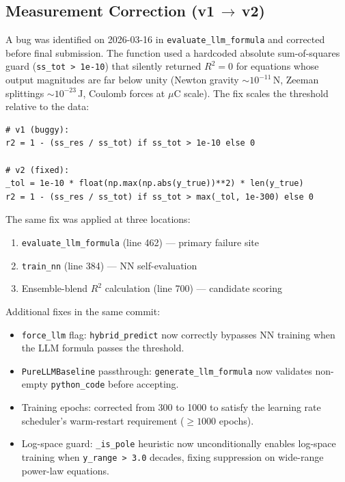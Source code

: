 \documentclass[twoside,11pt]{article}
\begin{document}
\subsection*{Measurement Correction (v1\,$\to$\,v2)}
\label{sec:r2_measurement_bugfix}

A bug was identified on 2026-03-16 in \texttt{evaluate\_llm\_formula}
and corrected before final submission. The function used a hardcoded
absolute sum-of-squares guard (\texttt{ss\_tot > 1e-10}) that silently
returned $R^2=0$ for equations whose output magnitudes are far below unity
(Newton gravity $\sim\!10^{-11}$\,N, Zeeman splittings $\sim\!10^{-23}$\,J,
Coulomb forces at $\mu$C scale). The fix scales the threshold relative
to the data:

\begin{verbatim}
# v1 (buggy):
r2 = 1 - (ss_res / ss_tot) if ss_tot > 1e-10 else 0

# v2 (fixed):
_tol = 1e-10 * float(np.max(np.abs(y_true))**2) * len(y_true)
r2 = 1 - (ss_res / ss_tot) if ss_tot > max(_tol, 1e-300) else 0
\end{verbatim}

The same fix was applied at three locations:
\begin{enumerate}
  \item \texttt{evaluate\_llm\_formula} (line 462) — primary failure site
  \item \texttt{train\_nn} (line 384) — NN self-evaluation
  \item Ensemble-blend $R^2$ calculation (line 700) — candidate scoring
\end{enumerate}

Additional fixes in the same commit:
\begin{itemize}
  \item \texttt{force\_llm} flag: \texttt{hybrid\_predict} now correctly
    bypasses NN training when the LLM formula passes the threshold.
  \item \texttt{PureLLMBaseline} passthrough: \texttt{generate\_llm\_formula}
    now validates non-empty \texttt{python\_code} before accepting.
  \item Training epochs: corrected from 300 to 1000 to satisfy the learning
    rate scheduler's warm-restart requirement ($\geq\!1000$ epochs).
  \item Log-space guard: \texttt{\_is\_pole} heuristic now unconditionally
    enables log-space training when \texttt{y\_range > 3.0} decades,
    fixing suppression on wide-range power-law equations.
\end{itemize}
\end{document}
